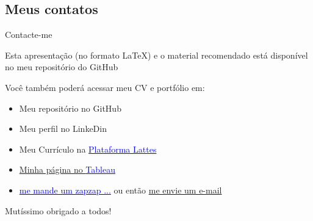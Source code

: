 \documentclass{beamer}
\begin{document}
    

\subsection{Meus contatos}
\begin{frame}{Contacte-me}

\begin{center}
Esta apresentação (no formato \LaTeX{}) e o material recomendado está disponível no meu repositório do GitHub
 \href{https://github.com/rhozon/Banca-FAE}{\faGithub}
\end{center}


Você também poderá acessar meu CV e portfólio em:
\begin{center}
\vspace{.25cm}
\vspace{.25cm}
\end{center}

\begin{itemize}
    \item Meu repositório no GitHub \href{https://github.com/rhozon}{\faGithub}
    \item Meu perfil no LinkeDin \href{https://www.linkedin.com/in/rodrigohermontozon/}{\faLinkedin}
    \item Meu Currículo na \href{http://lattes.cnpq.br/3532649625879285}{\textcolor{blue}{Plataforma Lattes}}
    \item \href{https://public.tableau.com/profile/rodrigoozon#!/}{Minha página no \textcolor{blue}{Tableau}}
    \item \href{https://api.whatsapp.com/send?phone=5541988382904&text=Ol\%C3\%A1\%20prof.\%20Rodrigo\%2C\%20participei\%20de\%20sua\%20banca\%20na\%20FAE...}{\textcolor{blue}{me mande um zapzap ...}}
    \subitem ou então \textcolor{blue}{\href{mailto:rodrigoozon@yahoo.com.br}{me envie um e-mail}}
\end{itemize}

\vspace{.025cm}
\begin{center}
    Mutíssimo obrigado a todos! \faSmileO
\end{center}
\end{frame}

\end{document}
